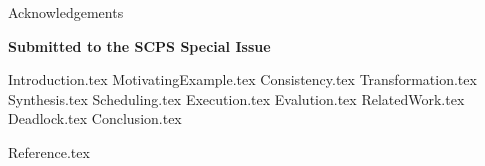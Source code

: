 \documentclass[acmtocl,acmnow]{acmtrans2m}
\begin{document}
\begin{bottomstuff}
 {Acknowledgements}
\end{bottomstuff}


\maketitle

{\bf Submitted to the SCPS Special Issue}

 {Introduction.tex}
 {MotivatingExample.tex}
 {Consistency.tex}
 {Transformation.tex}
 {Synthesis.tex}
 {Scheduling.tex}
 {Execution.tex}
 {Evalution.tex}
 {RelatedWork.tex}
 {Deadlock.tex}
 {Conclusion.tex}

 {Reference.tex}
\end{document}
